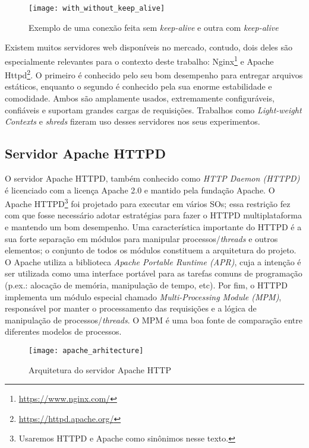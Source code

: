 \begin{figure}[!h]
  \centering
  \texttt{[image: with\_without\_keep\_alive]}
  \caption{Exemplo de uma conexão feita sem \emph{keep-alive} e outra com \emph{keep-alive}}
  \label{fig:keep_alive}
\end{figure}

Existem muitos servidores web disponíveis no mercado, contudo, dois deles são
especialmente relevantes para o contexto deste trabalho:
Nginx\footnote{\url{https://www.nginx.com/}} e Apache
Httpd\footnote{\url{https://httpd.apache.org/}}.  O primeiro é conhecido pelo
seu bom desempenho para entregar arquivos estáticos, enquanto o segundo é conhecido
pela sua enorme estabilidade e comodidade. Ambos são amplamente usados,
extremamente configuráveis, confiáveis e suportam grandes cargas de
requisições. Trabalhos como \emph{Light-weight Contexts} e \emph{shreds}
fizeram uso desses servidores nos seus experimentos.

\subsection{Servidor Apache HTTPD}
\label{sec:architecture}

O servidor Apache HTTPD, também conhecido como \emph{HTTP Daemon (HTTPD)} é
licenciado com a licença Apache 2.0 e mantido pela fundação Apache.  O Apache
HTTPD\footnote{Usaremos HTTPD e Apache como sinônimos nesse texto.} foi
projetado para executar em vários SOs; essa restrição fez com que fosse
necessário adotar estratégias para fazer o HTTPD multiplataforma e mantendo um
bom desempenho. Uma característica importante do HTTPD é a sua forte separação
em módulos para manipular processos/\emph{threads} e outros elementos; o
conjunto de todos os módulos constituem a arquitetura do projeto. O Apache
utiliza a biblioteca \emph{Apache Portable Runtime (APR)}, cuja a intenção é
ser utilizada como uma interface portável para as tarefas comuns de programação
(p.ex.: alocação de memória, manipulação de tempo, etc). Por fim, o HTTPD
implementa um módulo especial chamado \emph{Multi-Processing Module (MPM)},
responsável por manter o processamento das requisições e a lógica de
manipulação de processos/\emph{threads}. O MPM é uma boa fonte de comparação entre
diferentes modelos de processos.

\begin{figure}[!h]
  \centering
  \texttt{[image: apache\_arhitecture]} 
	\caption[Arquitetura do servidor Apache HTTP]{Arquitetura do servidor Apache HTTP \citep{apache_module_book}}
  \label{fig:apache_architecture} 
\end{figure}

